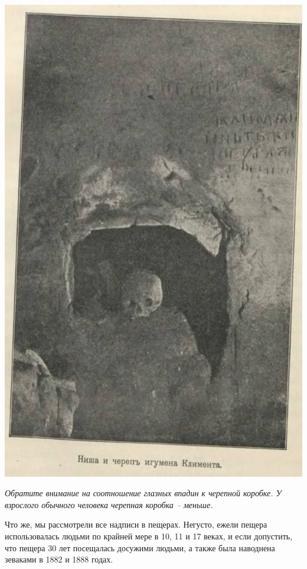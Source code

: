 \vspace*{\fill}

\newpage

\begin{center}
\includegraphics[width=0.95\linewidth]{chast-colebanie-osnov/nachalo/zverp-05.jpg}

\textit{Обратите внимание на соотношение глазных впадин к черепной коробке. У взрослого обычного человека черепная коробка – меньше.}
\end{center}

Что же, мы рассмотрели все надписи в пещерах. Негусто, ежели пещера использовалась людьми по крайней мере в 10, 11 и 17 веках, и если допустить, что пещера 30 лет посещалась досужими людьми, а также была наводнена зеваками в 1882 и 1888 годах.

